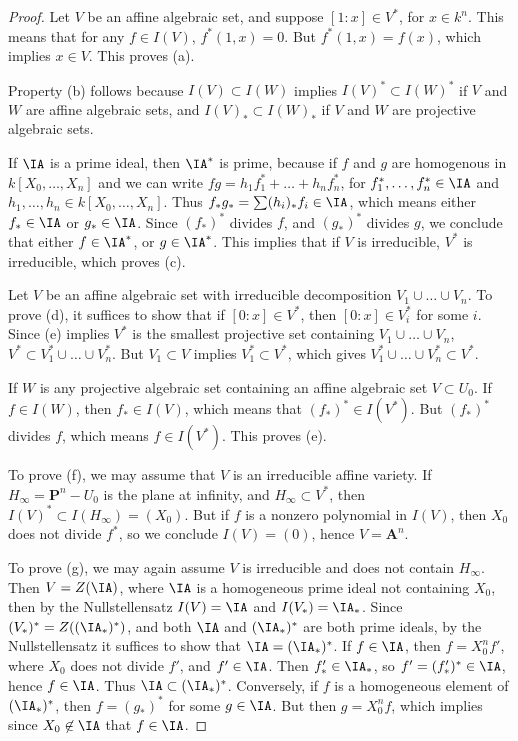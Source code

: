 \begin{proof}
    Let $V$ be an affine algebraic set, and suppose $[1:x] \in V^*$, for $x \in k^n$. This means that for any $f \in I(V)$, $f^*(1,x) = 0$. But $f^*(1,x) = f(x)$, which implies $x \in V$. This proves (a).

    Property (b) follows because $I(V) \subset I(W)$ implies $I(V)^* \subset I(W)^*$ if $V$ and $W$ are affine algebraic sets, and $I(V)_* \subset I(W)_*$ if $V$ and $W$ are projective algebraic sets.

    If $\IA$ is a prime ideal, then $\IA^*$ is prime, because if $f$ and $g$ are homogenous in $k[X_0,\dots,X_n]$ and we can write $fg = h_1f_1^* + \dots + h_nf_n^*$, for $f_1^*,\dots,f_n^* \in \IA$ and $h_1,\dots,h_n \in k[X_0,\dots,X_n]$. Thus $f_* g_* = \sum (h_i)_* f_i \in \IA$, which means either $f_* \in \IA$ or $g_* \in \IA$. Since $(f_*)^*$ divides $f$, and $(g_*)^*$ divides $g$, we conclude that either $f \in \IA^*$, or $g \in \IA^*$. This implies that if $V$ is irreducible, $V^*$ is irreducible, which proves (c).

    Let $V$ be an affine algebraic set with irreducible decomposition $V_1 \cup \dots \cup V_n$. To prove (d), it suffices to show that if $[0:x] \in V^*$, then $[0:x] \in V_i^*$ for some $i$. Since (e) implies $V^*$ is the smallest projective set containing $V_1 \cup \dots \cup V_n$, $V^* \subset V_1^* \cup \dots \cup V_n^*$. But $V_1 \subset V$ implies $V_1^* \subset V^*$, which gives $V_1^* \cup \dots \cup V_n^* \subset V^*$.

    If $W$ is any projective algebraic set containing an affine algebraic set $V \subset U_0$. If $f \in I(W)$, then $f_* \in I(V)$, which means that $(f_*)^* \in I(V^*)$. But $(f_*)^*$ divides $f$, which means $f \in I(V^*)$. This proves (e).

    To prove (f), we may assume that $V$ is an irreducible affine variety. If $H_\infty = \mathbf{P}^n - U_0$ is the plane at infinity, and $H_\infty \subset V^*$, then $I(V)^* \subset I(H_\infty) = (X_0)$. But if $f$ is a nonzero polynomial in $I(V)$, then $X_0$ does not divide $f^*$, so we conclude $I(V) = (0)$, hence $V = \mathbf{A}^n$.

    To prove (g), we may again assume $V$ is irreducible and does not contain $H_\infty$. Then $V = Z(\IA)$, where $\IA$ is a homogeneous prime ideal not containing $X_0$, then by the Nullstellensatz $I(V) = \IA$ and $I(V_*) = \IA_*$. Since $(V_*)^* = Z((\IA_*)^*)$, and both $\IA$ and $(\IA_*)^*$ are both prime ideals, by the Nullstellensatz it suffices to show that $\IA = (\IA_*)^*$. If $f \in \IA$, then $f = X_0^n f'$, where $X_0$ does not divide $f'$, and $f' \in \IA$. Then $f'_* \in \IA_*$, so $f' = (f'_*)^* \in \IA$, hence $f \in \IA$. Thus $\IA \subset (\IA_*)^*$. Conversely, if $f$ is a homogeneous element of $(\IA_*)^*$, then $f = (g_*)^*$ for some $g \in \IA$. But then $g = X_0^n f$, which implies since $X_0 \not \in \IA$ that $f \in \IA$.
\end{proof}

